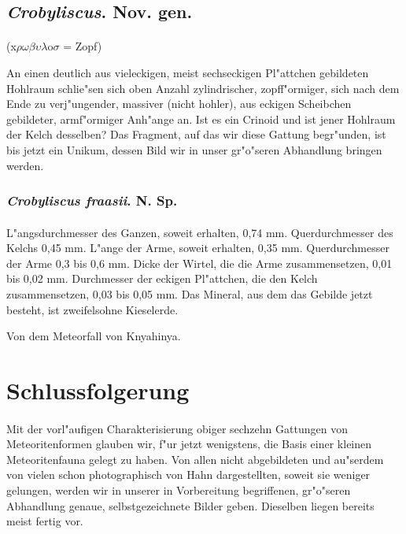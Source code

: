 \documentclass[a4paper, 11pt, oneside]{article}
\begin{document}
\subsection{\emph{Crobyliscus}. Nov. gen.}
\paragraph{}
(x$\rho\omega\beta\upsilon\lambda$o$\sigma$ = Zopf)%

An einen deutlich aus vieleckigen, meist sechseckigen Pl"attchen gebildeten Hohlraum schlie"sen sich oben Anzahl zylindrischer, zopff"ormiger, sich nach dem Ende zu verj"ungender, massiver (nicht hohler), aus eckigen Scheibchen gebildeter, armf"ormiger Anh"ange an. Ist es ein Crinoid und ist jener Hohlraum der Kelch desselben? Das Fragment, auf das wir diese Gattung begr"unden, ist bis jetzt ein Unikum, dessen Bild wir in unser gr"o"seren Abhandlung bringen werden.
\subsubsection{\emph{Crobyliscus fraasii}. N. Sp.}
\paragraph{}
L"angsdurchmesser des Ganzen, soweit erhalten, 0,74 mm. Querdurchmesser des Kelchs 0,45 mm. L"ange der Arme, soweit erhalten, 0,35 mm. Querdurchmesser der Arme 0,3 bis 0,6 mm. Dicke der Wirtel, die die Arme zusammensetzen, 0,01 bis 0,02 mm. Durchmesser der eckigen Pl"attchen, die den Kelch zusammensetzen, 0,03 bis 0,05 mm. Das Mineral, aus dem das Gebilde jetzt besteht, ist zweifelsohne Kieselerde.

Von dem Meteorfall von Knyahinya.
\clearpage
\section{Schlussfolgerung}
\paragraph{}
Mit der vorl"aufigen Charakterisierung obiger sechzehn Gattungen von Meteoritenformen glauben wir, f"ur jetzt wenigstens, die Basis einer kleinen Meteoritenfauna gelegt zu haben. Von allen nicht abgebildeten und au"serdem von vielen schon photographisch von Hahn dargestellten, soweit sie weniger gelungen, werden wir in unserer in Vorbereitung begriffenen, gr"o"seren Abhandlung genaue, selbstgezeichnete Bilder geben. Dieselben liegen bereits meist fertig vor.
\end{document}
